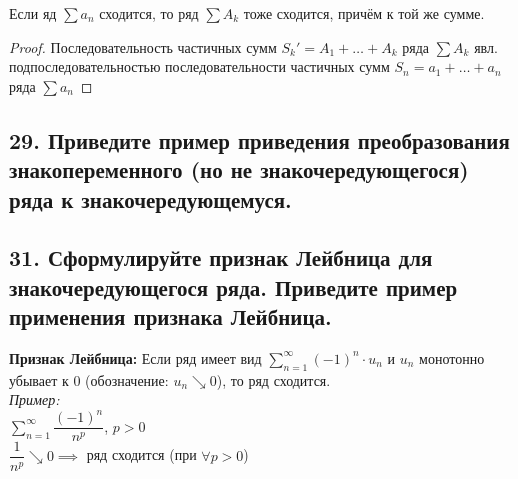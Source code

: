 \documentclass[a4paper, fleqn]{article}
\begin{document}
    \begin{proposition}
        Если яд $\sum a_n$ сходится, то ряд $\sum A_k$ тоже сходится, причём к той же сумме.
    \end{proposition}

    \begin{proof}
        Последовательность частичных сумм $S_k' = A_1 + \dots + A_k$ ряда $\sum A_k$
        явл. подпоследовательностью последовательности частичных сумм $S_n = a_1 + \dots + a_n$ ряда $\sum a_n$
    \end{proof}

        
     \subsection*{29. Приведите пример приведения преобразования знакопеременного
    (но не знакочередующегося) ряда к знакочередующемуся.}
            
    \subsection*{31. Сформулируйте признак Лейбница для знакочередующегося ряда. Приведите пример применения признака Лейбница.}
    \textbf{Признак Лейбница:} Если ряд имеет вид $\sum_{n=1}^{\infty}(-1)^n \cdot u_n$ и $u_n$ монотонно убывает к $0$ (обозначение: $u_n \searrow 0$), то ряд сходится. \\
    \textit{Пример: } \\
    $\sum_{n=1}^{\infty} \dfrac{(-1)^{n}}{n^p}$, $p > 0$ \\
    $\dfrac{1}{n^p} \searrow 0 \implies $ ряд сходится (при $\forall p > 0$) \\
        
\end{document}
